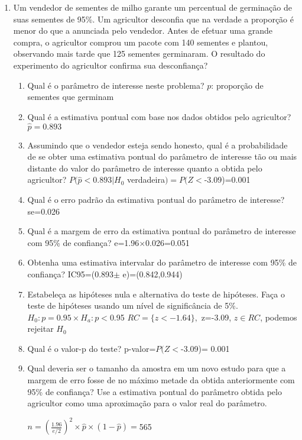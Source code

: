 \documentclass[
]{article}
\begin{document}
\begin{enumerate}
\item Um vendedor de sementes de milho garante um percentual de germinação de suas sementes de 95\%. Um agricultor desconfia que na verdade a proporção é menor do que a anunciada pelo vendedor. Antes de efetuar uma grande compra, o agricultor comprou um pacote com 140 sementes e plantou, observando mais tarde que 125 sementes germinaram. O resultado do experimento do agricultor confirma sua desconfiança? 
\begin{enumerate}
\item Qual é o parâmetro de interesse neste problema?
$p$: proporção de sementes que germinam
\item Qual é a estimativa pontual com base nos dados obtidos pelo agricultor?
$\hat{p}=0.893$
\item Assumindo que o vendedor esteja sendo honesto, qual é a probabilidade de se obter uma estimativa pontual do parâmetro de interesse tão ou mais distante do valor do parâmetro de interesse quanto a obtida pelo agricultor?
$P(\hat{p}<0.893|H_0$ verdadeira$)=P(Z<$-3.09)=0.001
\item Qual é o erro padrão da estimativa pontual do parâmetro de interesse?
se=0.026
\item Qual é a margem de erro da estimativa pontual do parâmetro de interesse com 95\% de confiança?
e=1.96$\times$0.026=0.051
\item Obtenha uma estimativa intervalar do parâmetro de interesse com 95\% de confiança?
IC95=(0.893$\pm$ e)=(0.842,0.944)
\item Estabeleça as hipóteses nula e alternativa do teste de hipóteses. Faça o teste de hipóteses usando um nível de significância de 5\%.
$H_0: p=0.95\times H_a:p <$0.95
$RC=\{z<-1.64\},$
z=-3.09, 
$z\in RC$, podemos rejeitar $H_0$
\item Qual é o valor-p do teste?
p-valor=$P(Z<$-3.09)= 0.001
\item Qual deveria ser o tamanho da amostra em um novo estudo para que a margem de erro fosse de no máximo metade da obtida anteriormente com 95\% de confiança? Use a estimativa pontual do parâmetro obtida pelo agricultor como uma aproximação para o valor real do parâmetro.

$n=(\frac{1.96}{e/2})^2 \times \hat{p}\times (1-\hat{p})=$565

\end{enumerate}

\end{enumerate}
\end{document}

